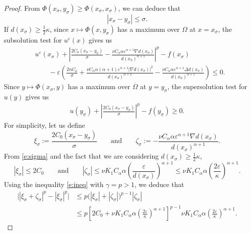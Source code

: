 \documentclass[11pt,reqno]{amsart}
\numberwithin{figure}{section}
\theoremstyle{plain}
\theoremstyle{remark}
\numberwithin{equation}{section}
\begin{document}
\begin{proof}
From $\Phi(x_\sigma, y_\sigma) \geq \Phi(x_\sigma, x_\sigma)$, we can deduce that
\begin{equation}\label{e:sigma}
    \left| x_\sigma - y_\sigma \right| \leq \sigma.  
\end{equation}
If $ d(x_\sigma) \geq \frac{1}{2}\kappa$, since $x\mapsto \Phi(x,y_\sigma)$ has a maximum over $\Omega$ at $x=x_\sigma$, the subsolution test for $u^\varepsilon(x)$ gives us
\begin{align}\label{e:subsln}
    &u^\varepsilon(x_\sigma) + \left|\frac{2C_0(x_\sigma - y_\sigma)}{\sigma} -  \frac{\nu C_\alpha\alpha \varepsilon^{\alpha+1} \nabla d(x_\sigma)}{d(x_\sigma)^{\alpha+1}}\right|^p - f(x_\sigma)\nonumber\\
    &\qquad -\varepsilon\left(\frac{2nC_0}{\sigma}+ \frac{\nu C_\alpha\alpha(\alpha+1) \varepsilon^{\alpha+1}|\nabla d(x_\sigma)|^2}{d(x_\sigma)^{\alpha+2}} - \frac{\nu C_\alpha\alpha \varepsilon^{\alpha+1}\Delta d(x_\sigma)}{d(x_\sigma)^{\alpha+1}}\right) \leq 0.
\end{align}
Since $y\mapsto \Phi(x_\sigma,y)$ has a maximum over $\overline{\Omega}$ at $y = y_\sigma$, the supersolution test for $u(y)$ gives us
\begin{align}\label{e:supersln}
    u(y_\sigma) + \left|\frac{2C_0(x_\sigma - y_\sigma)}{\sigma}\right|^p - f(y_\sigma) \geq 0.
\end{align}
For simplicity, let us define
\begin{equation*}
    \xi_\sigma := \frac{2C_0(x_\sigma - y_\sigma)}{\sigma} \qquad\text{and}\qquad \zeta_\sigma :=- \frac{\nu C_\alpha\alpha \varepsilon^{\alpha+1} \nabla d(x_\sigma)}{d(x_\sigma)^{\alpha+1}}.
\end{equation*}
From \eqref{e:sigma} and the fact that we are considering $d(x_\sigma) \geq \frac{1}{2}\kappa$, 
\begin{equation*}
    |\xi_\sigma|\leq 2C_0 \qquad\text{and}\qquad |\zeta_\sigma| \leq \nu K_1 C_\alpha\alpha \left(\frac{\varepsilon}{d(x_\sigma)}\right)^{\alpha+1} \leq \nu K_1 C_\alpha \alpha  \left(\frac{2\varepsilon}{\kappa}\right)^{\alpha+1}.
\end{equation*}
Using the inequality \eqref{e:ineq} with $\gamma = p > 1$, we deduce that
\begin{align}\label{e:estia}
    \Big||\xi_\sigma +\zeta_\sigma|^p - |\xi_\sigma|^p \Big| &\leq p\Big(|\xi_\sigma|+|\zeta_\sigma|\Big)^{p-1}|\zeta_\sigma|\nonumber\\
    &\leq p\left[2C_0+\nu K_1 C_\alpha\alpha \left(\frac{2\varepsilon}{\kappa}\right)^{\alpha+1}\right]^{p-1}\nu K_1 C_\alpha\alpha \left(\frac{2\varepsilon}{\kappa}\right)^{\alpha+1}.

\end{align}
\end{proof}
\end{document}
